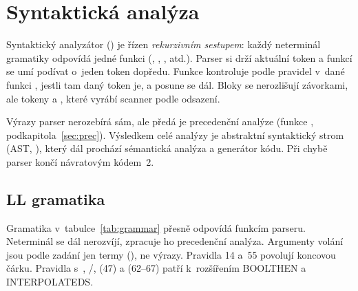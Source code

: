 \providecommand{\uvz}{\symbol{34}}

\section{Syntaktická analýza}
Syntaktický analyzátor () je řízen \textit{rekurzivním sestupem}:
každý neterminál gramatiky odpovídá jedné funkci 
(, , , atd.). Parser si
drží aktuální token  a funkcí  se umí podívat o~jeden
token dopředu. Funkce  kontroluje podle pravidel v~dané funkci
, jestli tam daný token je, a posune se dál. Bloky se nerozlišují závorkami, ale tokeny 
a , které vyrábí scanner podle odsazení.

Výrazy parser nerozebírá sám, ale předá je precedenční analýze
(funkce , podkapitola~\ref{sec:prec}). Výsledkem celé analýzy
je abstraktní syntaktický strom (AST, ), který dál prochází
sémantická analýza a generátor kódu. Při chybě parser končí návratovým
kódem~2.

\subsection{LL gramatika}
Gramatika v~tabulce~\ref{tab:grammar} přesně odpovídá funkcím parseru.
Neterminál  se dál nerozvíjí, zpracuje ho precedenční analýza.
Argumenty volání jsou podle zadání jen termy (), ne výrazy.
Pravidla 14 a~55 povolují koncovou čárku. Pravidla s~,
/,  (47) a  (62--67) patří
k~rozšířením BOOLTHEN a INTERPOLATEDS.

